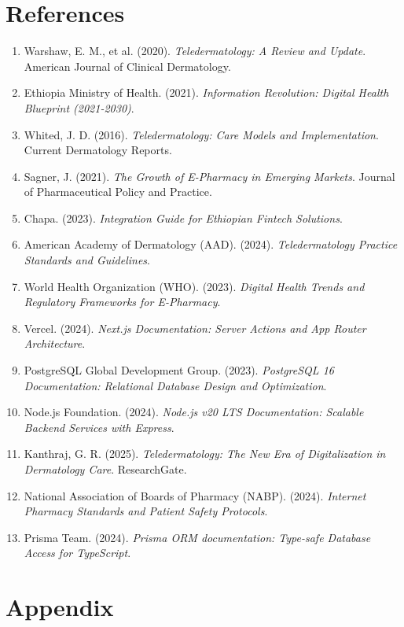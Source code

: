 \documentclass[12pt,a4paper]{report}
\begin{document}
\chapter{References}
\begin{enumerate}
    \item Warshaw, E. M., et al. (2020). \textit{Teledermatology: A Review and Update}. American Journal of Clinical Dermatology.
    \item Ethiopia Ministry of Health. (2021). \textit{Information Revolution: Digital Health Blueprint (2021-2030)}.
    \item Whited, J. D. (2016). \textit{Teledermatology: Care Models and Implementation}. Current Dermatology Reports.
    \item Sagner, J. (2021). \textit{The Growth of E-Pharmacy in Emerging Markets}. Journal of Pharmaceutical Policy and Practice.
    \item Chapa. (2023). \textit{Integration Guide for Ethiopian Fintech Solutions}.
    \item American Academy of Dermatology (AAD). (2024). \textit{Teledermatology Practice Standards and Guidelines}.
    \item World Health Organization (WHO). (2023). \textit{Digital Health Trends and Regulatory Frameworks for E-Pharmacy}.
    \item Vercel. (2024). \textit{Next.js Documentation: Server Actions and App Router Architecture}.
    \item PostgreSQL Global Development Group. (2023). \textit{PostgreSQL 16 Documentation: Relational Database Design and Optimization}.
    \item Node.js Foundation. (2024). \textit{Node.js v20 LTS Documentation: Scalable Backend Services with Express}.
    \item Kanthraj, G. R. (2025). \textit{Teledermatology: The New Era of Digitalization in Dermatology Care}. ResearchGate.
    \item National Association of Boards of Pharmacy (NABP). (2024). \textit{Internet Pharmacy Standards and Patient Safety Protocols}.
    \item Prisma Team. (2024). \textit{Prisma ORM documentation: Type-safe Database Access for TypeScript}.
\end{enumerate}

\chapter{Appendix}
\end{document}
